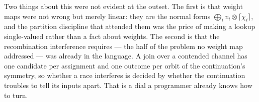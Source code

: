 \documentclass[11pt,a4paper]{article}
\theoremstyle{plain}
\theoremstyle{definition}
\theoremstyle{remark}
\newcommand{\tensorv}{\otimes}
\newcommand{\crisp}[1]{\lceil #1 \rceil}
\begin{document}
Two things about this were not evident at the outset. The first is that weight
maps were not wrong but merely linear: they are the normal forms
$\bigoplus_i v_i \tensorv \crisp{\chi_i}$, and the partition discipline that
attended them was the price of making a lookup single-valued rather than a fact
about weights. The second is that the recombination interference requires ---
the half of the problem no weight map addressed --- was already in the language.
A join over a contended channel has one candidate per assignment and one outcome
per orbit of the continuation's symmetry, so whether a race interferes is decided
by whether the continuation troubles to tell its inputs apart. That is a dial a
programmer already knows how to turn.
\end{document}

